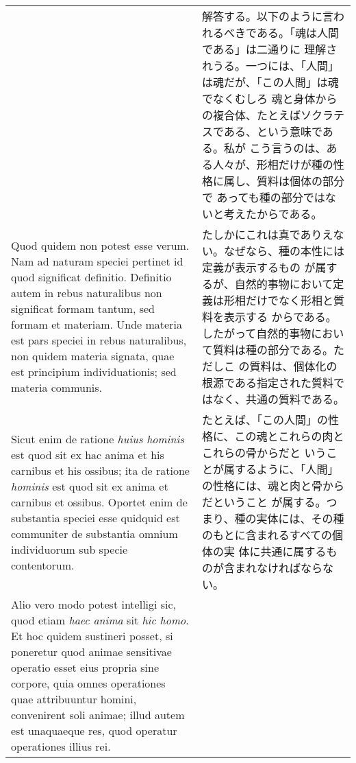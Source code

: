 \documentclass[paper=a4paper,fontsize=10pt,jafontsize=9pt,titlepage]{jlreq}
\begin{document}
\begin{longtable}{p{21em}p{21em}}
&

解答する。以下のように言われるべきである。「魂は人間である」は二通りに
理解されうる。一つには、「人間」は魂だが、「この人間」は魂でなくむしろ
魂と身体からの複合体、たとえばソクラテスである、という意味である。私が
こう言うのは、ある人々が、形相だけが種の性格に属し、質料は個体の部分で
あっても種の部分ではないと考えたからである。

\\



Quod quidem non potest esse verum. Nam ad naturam speciei pertinet id
quod significat definitio. Definitio autem in rebus naturalibus non
significat formam tantum, sed formam et materiam. Unde materia est
pars speciei in rebus naturalibus, non quidem materia signata, quae
est principium individuationis; sed materia communis.

&

たしかにこれは真でありえない。なぜなら、種の本性には定義が表示するもの
が属するが、自然的事物において定義は形相だけでなく形相と質料を表示する
からである。したがって自然的事物において質料は種の部分である。ただしこ
の質料は、個体化の根源である指定された質料ではなく、共通の質料である。


\\


Sicut enim de ratione {\itshape huius hominis} est quod sit ex hac
anima et his carnibus et his ossibus; ita de ratione {\itshape
hominis} est quod sit ex anima et carnibus et ossibus. Oportet enim de
substantia speciei esse quidquid est communiter de substantia omnium
individuorum sub specie contentorum.


&

たとえば、「この人間」の性格に、この魂とこれらの肉とこれらの骨からだと
いうことが属するように、「人間」の性格には、魂と肉と骨からだということ
が属する。つまり、種の実体には、その種のもとに含まれるすべての個体の実
体に共通に属するものが含まれなければならない。

\\



Alio vero modo potest intelligi sic, quod etiam {\itshape haec anima}
sit {\itshape hic homo}. Et hoc quidem sustineri posset, si poneretur
quod animae sensitivae operatio esset eius propria sine corpore, quia
omnes operationes quae attribuuntur homini, convenirent soli animae;
illud autem est unaquaeque res, quod operatur operationes illius rei.


&


\end{longtable}
\end{document}
